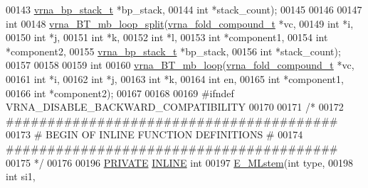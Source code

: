 \begin{DoxyCode}
00143                      \mbox{\hyperlink{group__data__structures_structvrna__bp__stack__s}{vrna\_bp\_stack\_t}}      *bp\_stack,
00144                      \textcolor{keywordtype}{int}                  *stack\_count);
00145 
00146 
00147 \textcolor{keywordtype}{int}
00148 \mbox{\hyperlink{group__loops_ga08245ee149f137d6665ef2bdfcc066a7}{vrna\_BT\_mb\_loop\_split}}(\mbox{\hyperlink{group__fold__compound_structvrna__fc__s}{vrna\_fold\_compound\_t}}  *vc,
00149                       \textcolor{keywordtype}{int}                   *i,
00150                       \textcolor{keywordtype}{int}                   *j,
00151                       \textcolor{keywordtype}{int}                   *k,
00152                       \textcolor{keywordtype}{int}                   *l,
00153                       \textcolor{keywordtype}{int}                   *component1,
00154                       \textcolor{keywordtype}{int}                   *component2,
00155                       \mbox{\hyperlink{group__data__structures_structvrna__bp__stack__s}{vrna\_bp\_stack\_t}}       *bp\_stack,
00156                       \textcolor{keywordtype}{int}                   *stack\_count);
00157 
00158 
00159 \textcolor{keywordtype}{int}
00160 \mbox{\hyperlink{group__loops_ga9cb520ddfd8b3a48089a7910b045d06b}{vrna\_BT\_mb\_loop}}(\mbox{\hyperlink{group__fold__compound_structvrna__fc__s}{vrna\_fold\_compound\_t}}  *vc,
00161                 \textcolor{keywordtype}{int}                   *i,
00162                 \textcolor{keywordtype}{int}                   *j,
00163                 \textcolor{keywordtype}{int}                   *k,
00164                 \textcolor{keywordtype}{int}                   en,
00165                 \textcolor{keywordtype}{int}                   *component1,
00166                 \textcolor{keywordtype}{int}                   *component2);
00167 
00168 
00169 \textcolor{preprocessor}{#ifndef VRNA\_DISABLE\_BACKWARD\_COMPATIBILITY}
00170 
00171 \textcolor{comment}{/*}
00172 \textcolor{comment}{ ########################################}
00173 \textcolor{comment}{ # BEGIN OF INLINE FUNCTION DEFINITIONS #}
00174 \textcolor{comment}{ ########################################}
00175 \textcolor{comment}{ */}
00176 
00196 \mbox{\hyperlink{edit__cost_8h_a5e151c615eda34903514212f05a5ccf8}{PRIVATE}} \mbox{\hyperlink{multibranch__loops_8h_a2eb6f9e0395b47b8d5e3eeae4fe0c116}{INLINE}} \textcolor{keywordtype}{int}
00197 \mbox{\hyperlink{group__loops_ga24f7234dbe63dab516e7ea993a3e9f2c}{E\_MLstem}}(\textcolor{keywordtype}{int}          type,
00198          \textcolor{keywordtype}{int}          si1,

\end{DoxyCode}
